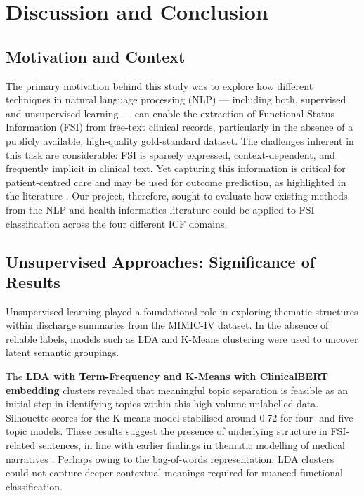 
\chapter{Discussion and Conclusion}

\section{Motivation and Context}

The primary motivation behind this study was to explore how different techniques in natural language processing (NLP) — including both, supervised and unsupervised learning — can enable the extraction of Functional Status Information (FSI) from free-text clinical records, particularly in the absence of a publicly available, high-quality gold-standard dataset. The challenges inherent in this task are considerable: FSI is sparsely expressed, context-dependent, and frequently implicit in clinical text. Yet capturing this information is critical for patient-centred care and may be used for outcome prediction, as highlighted in the literature \cite{newman2019broadening}. Our project, therefore, sought to evaluate how existing methods from the NLP and health informatics literature could be applied to FSI classification across the four different ICF domains.

\section{Unsupervised Approaches: Significance of Results}

Unsupervised learning played a foundational role in exploring thematic structures within discharge summaries from the MIMIC-IV dataset. In the absence of reliable labels, models such as LDA and K-Means clustering were used to uncover latent semantic groupings. \medskip

The \textbf{LDA with Term-Frequency and K-Means with ClinicalBERT embedding} clusters revealed that meaningful topic separation is feasible as an initial step in identifying topics within this high volume unlabelled data. Silhouette scores for the K-means model stabilised around 0.72 for four- and five-topic models. These results suggest the presence of underlying structure in FSI-related sentences, in line with earlier findings in thematic modelling of medical narratives \cite{low2020nlp}. 
Perhaps owing to the bag-of-words representation, LDA clusters could not capture deeper contextual meanings required for nuanced functional classification.
\medskip

